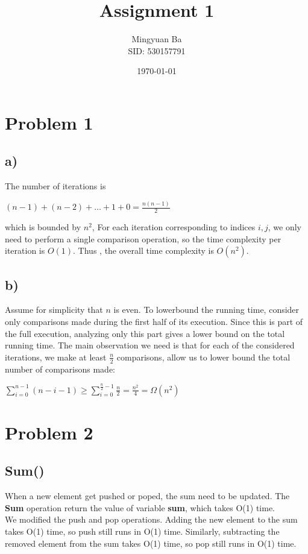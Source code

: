 \documentclass[12pt]{article}
\title{Assignment 1}
\author{Mingyuan Ba \\ SID: 530157791}
\date{\today}
\begin{document}
\maketitle

\section*{Problem 1}
\subsection*{a)}
The number of iterations is 
\begin{center}
    $(n-1) + (n-2) + \dots + 1 + 0= \frac{n(n-1)}{2}$
\end{center}
which is bounded by $n^2$, For each iteration corresponding to 
indices $i,j$, we only need to perform a single comparison operation, 
so the time complexity per iteration is $O(1)$.
Thus , the overall time complexity is $O(n^2)$.

\subsection*{b)}
Assume for simplicity that $n$ is even. To lowerbound the running time, 
consider only comparisons made during the first half of its execution.
Since this is part of the full execution, analyzing only this part 
gives a lower bound on the total running time.  The main observation we 
need is that for each of the considered iterations, we make at least 
$\frac{n}{2}$ comparisons, allow us to lower bound the total number 
of comparisons made:
\begin{center}
    $\sum_{i=0}^{n-1} (n-i-1) \geq \sum_{i=0}^{\frac{n}{2} - 1} \frac{n}{2}
    = \frac{n^2}{4} = \Omega{(n^2)}$
\end{center}

\newpage

\section*{Problem 2}

\subsection*{Sum()}

When a new element get pushed or poped, the sum need to be updated.
The \textbf{Sum} operation return the value of variable \textbf{sum},
which takes O(1) time.\\
We modified the push and pop operations. 
Adding the new element to the sum takes O(1) time, so push still runs 
in O(1) time. Similarly, subtracting the removed element from the 
sum takes O(1) time, so pop still runs in O(1) time.
\end{document}
